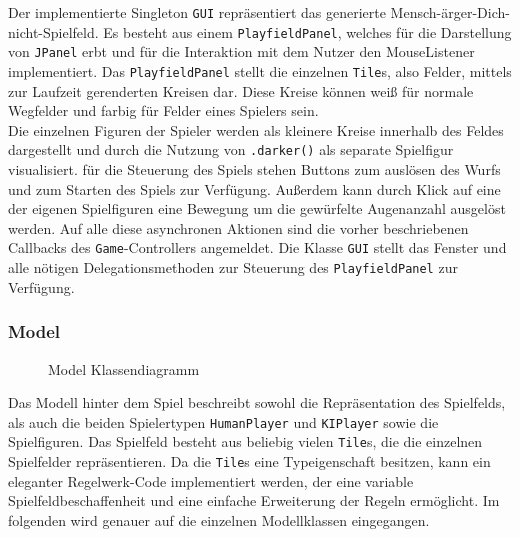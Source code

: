 \documentclass[conference]{IEEEtran}
\begin{document}
Der implementierte Singleton \texttt{GUI} repr\"asentiert das generierte Mensch-\"arger-Dich-nicht-Spielfeld. Es besteht aus einem \texttt{PlayfieldPanel}, welches f\"ur die Darstellung von \texttt{JPanel} erbt und f\"ur die Interaktion mit dem Nutzer den MouseListener implementiert. Das \texttt{PlayfieldPanel} stellt die einzelnen \texttt{Tile}s, also Felder, mittels zur Laufzeit gerenderten Kreisen dar. Diese Kreise k\"onnen wei{\ss} f\"ur normale Wegfelder und farbig f\"ur Felder eines Spielers sein. \\
  Die einzelnen Figuren der Spieler werden als kleinere Kreise innerhalb des Feldes dargestellt und durch die Nutzung von \texttt{.darker()} als separate Spielfigur visualisiert. f\"ur die Steuerung des Spiels stehen Buttons zum ausl\"osen des Wurfs und zum Starten des Spiels zur Verf\"ugung. Au{\ss}erdem kann durch Klick auf eine der eigenen Spielfiguren eine Bewegung um die gew\"urfelte Augenanzahl ausgel\"ost werden. Auf alle diese asynchronen Aktionen sind die vorher beschriebenen Callbacks des \texttt{Game}-Controllers angemeldet. Die Klasse \texttt{GUI} stellt das Fenster und alle n\"otigen Delegationsmethoden zur Steuerung des \texttt{PlayfieldPanel} zur Verf\"ugung. \\

\subsubsection{Model}
\begin{figure}[]
    \centering
    \caption{Model Klassendiagramm}
\end{figure}

Das Modell hinter dem Spiel beschreibt sowohl die Repr\"asentation des Spielfelds, als auch die beiden Spielertypen \texttt{HumanPlayer} und \texttt{KIPlayer} sowie die Spielfiguren. Das Spielfeld besteht aus beliebig vielen \texttt{Tile}s, die die einzelnen Spielfelder repr\"asentieren. Da die \texttt{Tile}s eine Typeigenschaft besitzen, kann ein eleganter Regelwerk-Code implementiert werden, der eine variable Spielfeldbeschaffenheit und eine einfache Erweiterung der Regeln erm\"oglicht.
Im folgenden wird genauer auf die einzelnen Modellklassen eingegangen.\\
\end{document}
